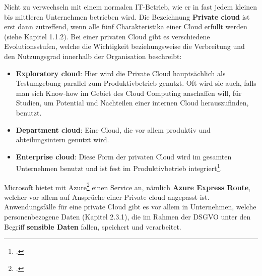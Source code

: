 Nicht zu verwechseln mit einem normalen IT-Betrieb, wie er in fast jedem kleinen bis mittleren Unternehmen betrieben wird. Die Bezeichnung \textbf{Private cloud} ist erst dann zutreffend, wenn alle fünf Charakteristika einer Cloud erfüllt werden (siehe Kapitel 1.1.2).
Bei einer privaten Cloud gibt es verschiedene Evolutionsstufen, welche die Wichtigkeit beziehungsweise die Verbreitung und den Nutzungsgrad innerhalb der Organisation beschreibt:
\begin{itemize}
	\item \textbf{Exploratory cloud}: Hier wird die Private Cloud hauptsächlich als Testumgebung parallel zum Produktivbetrieb genutzt. Oft wird sie auch, falls man sich Know-how im Gebiet des Cloud Computing anschaffen will, für Studien, um Potential und Nachteilen einer internen Cloud herauszufinden, benutzt.
	\item \textbf{Department cloud}: Eine Cloud, die vor allem produktiv und abteilungsintern genutzt wird.
	\item \textbf{Enterprise cloud}: Diese Form der privaten Cloud wird im gesamten Unternehmen benutzt und ist fest im Produktivbetrieb integriert\footcite{Lehrunterlagen-HTL-cloud}.
\end{itemize}

Microsoft bietet mit Azure\footcite{cloud-ms-privat} einen Service an, nämlich \textbf{Azure Express Route}, welcher vor allem auf Ansprüche einer Private cloud angepasst ist.
Anwendungsfälle für eine private Cloud gibt es vor allem in Unternehmen, welche personenbezogene Daten (Kapitel 2.3.1), die im Rahmen der DSGVO unter den Begriff \textbf{sensible Daten} fallen, speichert und verarbeitet.


